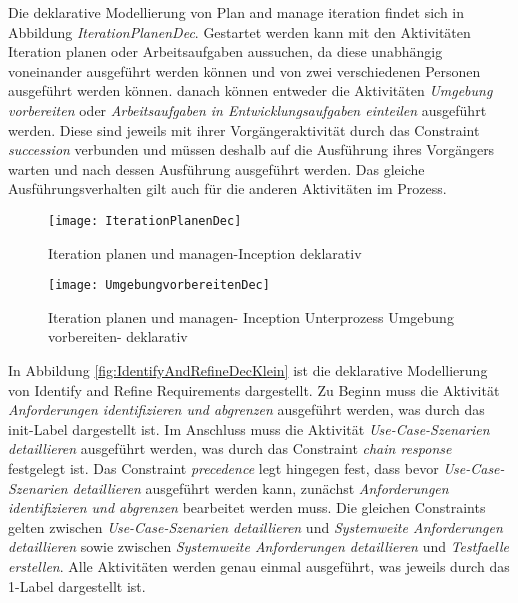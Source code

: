 Die deklarative Modellierung von Plan and manage iteration findet sich in Abbildung \textit{IterationPlanenDec}. Gestartet werden kann mit den Aktivitäten {Iteration planen} oder {Arbeitsaufgaben aussuchen}, da diese unabhängig voneinander ausgeführt werden können und von zwei verschiedenen Personen ausgeführt werden können.\newline
danach können entweder die Aktivitäten \textit{Umgebung vorbereiten} oder \textit{Arbeitsaufgaben in Entwicklungsaufgaben einteilen} ausgeführt werden. Diese sind jeweils mit ihrer Vorgängeraktivität durch das Constraint \textit{succession} verbunden und müssen deshalb auf die Ausführung ihres Vorgängers warten und nach dessen Ausführung ausgeführt werden.\newline
Das gleiche Ausführungsverhalten gilt auch für die anderen Aktivitäten im Prozess. 



\begin{figure}[htp]
\begin{center}
  \texttt{[image: IterationPlanenDec]} %
  \caption{Iteration planen und managen-Inception deklarativ}
  \label{fig:IterationPlanenDec}
\end{center}
\end{figure}

\begin{figure}[htp]
\begin{center}
  \texttt{[image: UmgebungvorbereitenDec]} %
  \caption{Iteration planen und managen- Inception Unterprozess Umgebung vorbereiten- deklarativ}
  \label{fig:UmgebungVorbereitenDec}
\end{center}
\end{figure}


In Abbildung \ref{fig:IdentifyAndRefineDecKlein} ist die deklarative Modellierung von Identify and Refine Requirements dargestellt.\newline
Zu Beginn muss die Aktivität \textit{Anforderungen identifizieren und abgrenzen} ausgeführt werden, was durch das init-Label dargestellt ist. Im Anschluss muss die Aktivität \textit{Use-Case-Szenarien detaillieren} ausgeführt werden, was durch das Constraint \textit{chain response} festgelegt ist. Das Constraint \textit{precedence} legt hingegen fest, dass bevor \textit{Use-Case-Szenarien detaillieren} ausgeführt werden kann, zunächst \textit{Anforderungen identifizieren und abgrenzen}  bearbeitet werden muss. Die gleichen Constraints gelten zwischen \textit{Use-Case-Szenarien detaillieren} und \textit{Systemweite Anforderungen detaillieren} sowie zwischen \textit{Systemweite Anforderungen detaillieren} und \textit{Testfaelle erstellen}. Alle Aktivitäten werden genau einmal ausgeführt, was jeweils durch das 1-Label dargestellt ist. 

